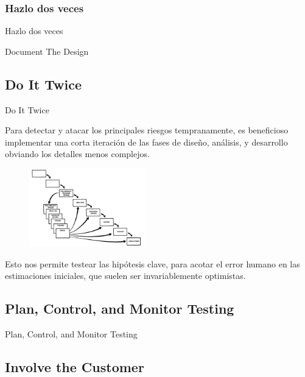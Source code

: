 \documentclass{beamer}
\begin{document}
\subsubsection{Hazlo dos veces}
\begin{frame}{Hazlo dos veces}

\begin{frame}{Document The Design}

\end{frame}

\subsection{Do It Twice}
\begin{frame}{Do It Twice}

Para detectar y atacar los principales riesgos tempranamente, es beneficioso implementar una corta iteración de las fases de diseño, análisis, y desarrollo obviando los detalles menos complejos.

\begin{figure}
\includegraphics[width=0.45\textwidth]{figures/hazloDosVeces.png}
\end{figure}

Esto nos permite testear las hipótesis clave, para acotar el error humano en las estimaciones iniciales, que suelen ser invariablemente optimistas.



\end{frame}

\subsection{Plan, Control, and Monitor Testing}

\begin{frame}{Plan, Control, and Monitor Testing}

\end{frame}


\subsection{Involve the Customer}


\end{frame}
\end{document}
